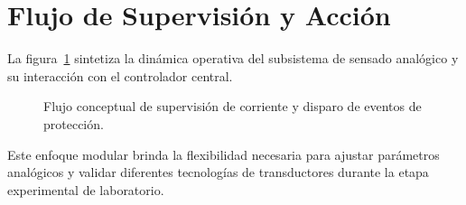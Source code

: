 \section{Flujo de Supervisión y Acción}
\label{sec:ea2_flujo}

La figura~\ref{fig.ej2:flujo_sensado} sintetiza la dinámica operativa del subsistema de sensado analógico y su
interacción con el controlador central.

\begin{figure}[!ht]
  \centering
  \resizebox{0.68\linewidth}{!}{}
  \caption{Flujo conceptual de supervisión de corriente y disparo de eventos de protección.}
  \label{fig.ej2:flujo_sensado}
\end{figure}

Este enfoque modular brinda la flexibilidad necesaria para ajustar parámetros analógicos y validar diferentes
tecnologías de transductores durante la etapa experimental de laboratorio.
